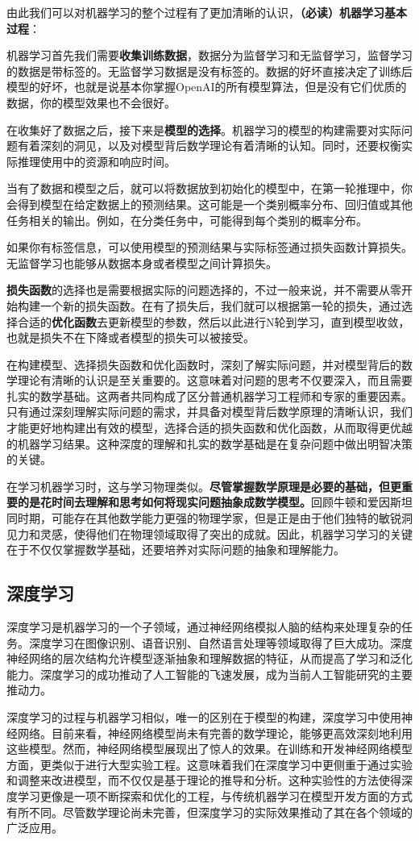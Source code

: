 由此我们可以对机器学习的整个过程有了更加清晰的认识，\textbf{（必读）机器学习基本过程}：

机器学习首先我们需要\textbf{收集训练数据}，数据分为监督学习和无监督学习，监督学习的数据是带标签的。无监督学习数据是没有标签的。数据的好坏直接决定了训练后模型的好坏，也就是说基本你掌握OpenAI的所有模型算法，但是没有它们优质的数据，你的模型效果也不会很好。

在收集好了数据之后，接下来是\textbf{模型的选择}。机器学习的模型的构建需要对实际问题有着深刻的洞见，以及对模型背后数学理论有着清晰的认知。同时，还要权衡实际推理使用中的资源和响应时间。

当有了数据和模型之后，就可以将数据放到初始化的模型中，在第一轮推理中，你会得到模型在给定数据上的预测结果。这可能是一个类别概率分布、回归值或其他任务相关的输出。例如，在分类任务中，可能得到每个类别的概率分布。

如果你有标签信息，可以使用模型的预测结果与实际标签通过损失函数计算损失。无监督学习也能够从数据本身或者模型之间计算损失。

\textbf{损失函数}的选择也是需要根据实际的问题选择的，不过一般来说，并不需要从零开始构建一个新的损失函数。在有了损失后，我们就可以根据第一轮的损失，通过选择合适的\textbf{优化函数}去更新模型的参数，然后以此进行N轮到学习，直到模型收敛，也就是损失不在下降或者模型的损失可以被接受。

在构建模型、选择损失函数和优化函数时，深刻了解实际问题，并对模型背后的数学理论有清晰的认识是至关重要的。这意味着对问题的思考不仅要深入，而且需要扎实的数学基础。这两者共同构成了区分普通机器学习工程师和专家的重要因素。只有通过深刻理解实际问题的需求，并具备对模型背后数学原理的清晰认识，我们才能更好地构建出有效的模型，选择合适的损失函数和优化函数，从而取得更优越的机器学习结果。这种深度的理解和扎实的数学基础是在复杂问题中做出明智决策的关键。

在学习机器学习时，这与学习物理类似。\textbf{尽管掌握数学原理是必要的基础，但更重要的是花时间去理解和思考如何将现实问题抽象成数学模型。}回顾牛顿和爱因斯坦同时期，可能存在其他数学能力更强的物理学家，但是正是由于他们独特的敏锐洞见力和灵感，使得他们在物理领域取得了突出的成就。因此，机器学习学习的关键在于不仅仅掌握数学基础，还要培养对实际问题的抽象和理解能力。

\subsection{深度学习}

深度学习是机器学习的一个子领域，通过神经网络模拟人脑的结构来处理复杂的任务。深度学习在图像识别、语音识别、自然语言处理等领域取得了巨大成功。深度神经网络的层次结构允许模型逐渐抽象和理解数据的特征，从而提高了学习和泛化能力。深度学习的成功推动了人工智能的飞速发展，成为当前人工智能研究的主要推动力。


深度学习的过程与机器学习相似，唯一的区别在于模型的构建，深度学习中使用神经网络。目前来看，神经网络模型尚未有完善的数学理论，能够更高效深刻地利用这些模型。然而，神经网络模型展现出了惊人的效果。在训练和开发神经网络模型方面，更类似于进行大型实验工程。这意味着我们在深度学习中更侧重于通过实验和调整来改进模型，而不仅仅是基于理论的推导和分析。这种实验性的方法使得深度学习更像是一项不断探索和优化的工程，与传统机器学习在模型开发方面的方式有所不同。尽管数学理论尚未完善，但深度学习的实际效果推动了其在各个领域的广泛应用。


